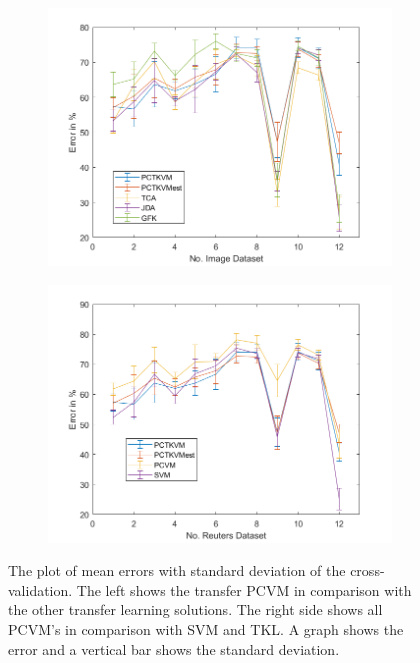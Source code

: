 \begin{figure}
	\centering
	\begin{subfigure}{.5\textwidth}
		\centering
		\includegraphics[width=1\linewidth]{figures/FiveTwoImageTL.png}
		\caption{\label{FigErrorImgTL}}
	\end{subfigure}%
	\begin{subfigure}{.5\textwidth}
		\centering
		\includegraphics[width=1\linewidth]{figures/PerformanceImage.png}
		\caption{\label{FigErrorImgO}}
	\end{subfigure}
	\caption[Plot of mean Error and a standard Deviation on Image Dataset]{The plot of mean errors with standard deviation of the cross-validation. The left shows the transfer \acs{PCVM} in comparison with the other transfer learning solutions. The right side shows all \acs{PCVM}'s in comparison with \acs{SVM} and \acs{TKL}. A graph shows the error and a vertical bar shows the standard deviation. \label{FigErrorImgDatasetsB}}
\end{figure}

